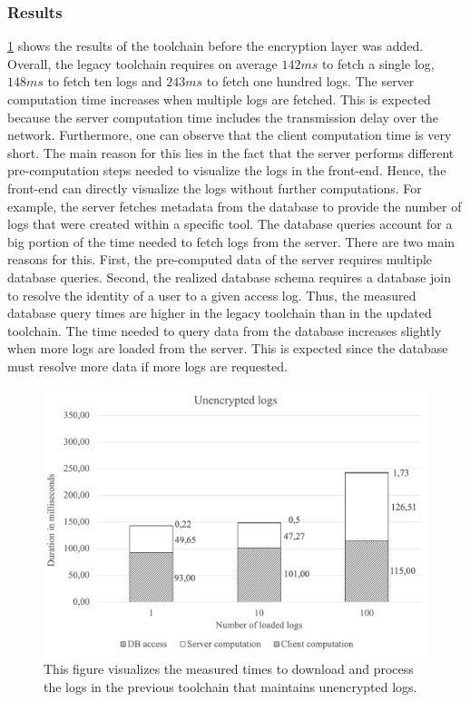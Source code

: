 \documentclass[../main.tex]{subfiles}
\begin{document}
\subsubsection{Results}
\cref{fig:perf-unencrypted} shows the results of the toolchain before the encryption layer was added.
Overall, the legacy toolchain requires on average $142ms$ to fetch a single log, $148ms$ to fetch ten logs and $243ms$ to fetch one hundred logs.
The server computation time increases when multiple logs are fetched.
This is expected because the server computation time includes the transmission delay over the network.
Furthermore, one can observe that the client computation time is very short.
The main reason for this lies in the fact that the server performs different pre-computation steps needed to visualize the logs in the front-end.
Hence, the front-end can directly visualize the logs without further computations.
For example, the server fetches metadata from the database to provide the number of logs that were created within a specific tool.
The database queries account for a big portion of the time needed to fetch logs from the server.
There are two main reasons for this.
First, the pre-computed data of the server requires multiple database queries.
Second, the realized database schema requires a database join to resolve the identity of a user to a given access log.
Thus, the measured database query times are higher in the legacy toolchain than in the updated toolchain.
The time needed to query data from the database increases slightly when more logs are loaded from the server.
This is expected since the database must resolve more data if more logs are requested.

\begin{figure}[ht]
    \includegraphics[scale=0.62]{../img/07/unencrypted.png}
    \centering
    \caption[Encryption duration]{This figure visualizes the measured times to download and process the logs in the previous toolchain that maintains unencrypted logs.}
    \label{fig:perf-unencrypted}
\end{figure}
\end{document}
